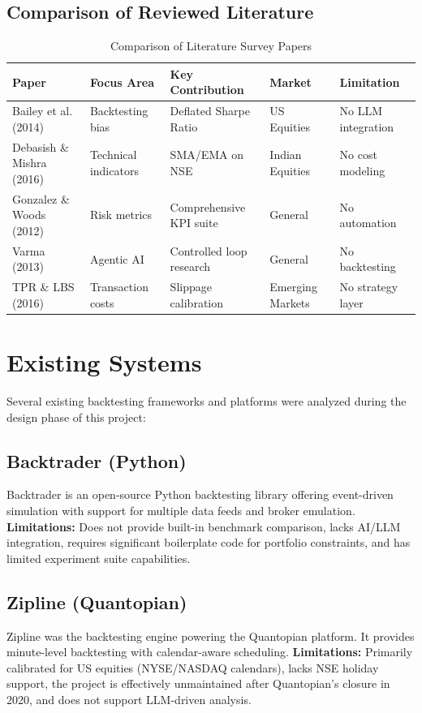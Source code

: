 \vspace{0.5cm}
\subsection{Comparison of Reviewed Literature}

\begin{table}[H]
\centering
\caption{Comparison of Literature Survey Papers}
\label{tab:litsurvey}
\small
\begin{tabular}{|p{2.5cm}|p{3cm}|p{3cm}|p{2.5cm}|p{2.5cm}|}
\hline
\textbf{Paper} & \textbf{Focus Area} & \textbf{Key Contribution} & \textbf{Market} & \textbf{Limitation} \\
\hline
Bailey et al. (2014) & Backtesting bias & Deflated Sharpe Ratio & US Equities & No LLM integration \\
\hline
Debasish \& Mishra (2016) & Technical indicators & SMA/EMA on NSE & Indian Equities & No cost modeling \\
\hline
Gonzalez \& Woods (2012) & Risk metrics & Comprehensive KPI suite & General & No automation \\
\hline
Varma (2013) & Agentic AI & Controlled loop research & General & No backtesting \\
\hline
TPR \& LBS (2016) & Transaction costs & Slippage calibration & Emerging Markets & No strategy layer \\
\hline
\end{tabular}
\end{table}

\section{Existing Systems}

Several existing backtesting frameworks and platforms were analyzed during the design phase of this project:

\subsection{Backtrader (Python)}
Backtrader is an open-source Python backtesting library offering event-driven simulation with support for multiple data feeds and broker emulation. \textbf{Limitations:} Does not provide built-in benchmark comparison, lacks AI/LLM integration, requires significant boilerplate code for portfolio constraints, and has limited experiment suite capabilities.

\subsection{Zipline (Quantopian)}
Zipline was the backtesting engine powering the Quantopian platform. It provides minute-level backtesting with calendar-aware scheduling. \textbf{Limitations:} Primarily calibrated for US equities (NYSE/NASDAQ calendars), lacks NSE holiday support, the project is effectively unmaintained after Quantopian's closure in 2020, and does not support LLM-driven analysis.

